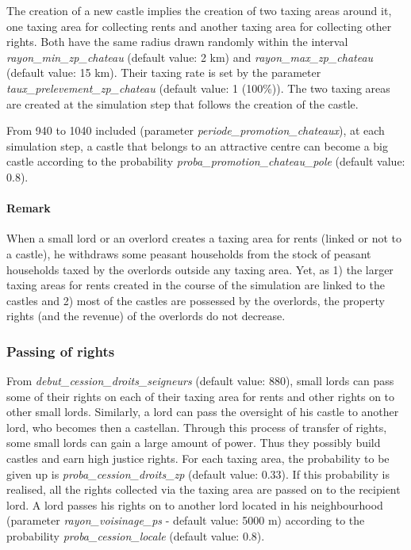 \documentclass[a4paper,11pt]{article}
\begin{document}
{\bigskip
\begin{sloppypar}
The creation of a new castle implies the creation of two taxing areas around it, one taxing area for collecting rents and another taxing area for collecting other rights. Both have the same radius drawn randomly within the interval \textit{rayon\_min\_zp\_chateau} (default value: 2 km) and \textit{rayon\_max\_zp\_chateau} (default value: 15 km). Their taxing rate is set by the parameter \textit{taux\_prelevement\_zp\_chateau} (default value: 1 (100\%)). The two taxing areas are created at the simulation step that follows the creation of the castle.
\end{sloppypar}

\bigskip
From 940 to 1040 included (parameter \textit{periode\_promotion\_chateaux}), at each simulation step, a castle that belongs to an attractive centre can become a big castle according to the probability  \textit{proba\_promotion\_chateau\_pole} (default value: 0.8).

\paragraph{Remark}
When a small lord or an overlord creates a taxing area for rents (linked or not to a castle), he withdraws some peasant households from the stock of peasant households taxed by the overlords outside any taxing area. Yet, as 1) the larger taxing areas for rents created in the course of the simulation are linked to the castles and 2) most of the castles are possessed by the overlords, the property rights (and the revenue) of the overlords do not decrease.


\subsubsection{Passing of rights}
\begin{sloppypar}

From \textit{debut\_cession\_droits\_seigneurs} (default value: 880), small lords can pass some of their rights on each of their taxing area for rents and other rights on to other small lords. Similarly, a lord can pass the oversight of his castle to another lord, who becomes then a castellan. Through this process of transfer of rights, some small lords can gain a large amount of power. Thus they possibly build castles and earn high justice rights. For each taxing area, the probability to be given up is \textit{proba\_cession\_droits\_zp} (default value: 0.33). If this probability is realised, all the rights collected via the taxing area are passed on to the recipient lord. A lord passes his rights on to another lord located in his neighbourhood (parameter \textit{rayon\_voisinage\_ps} - default value: 5000 m) according to the probability \textit{proba\_cession\_locale} (default value: 0.8).


\end{sloppypar}}
\end{document}
